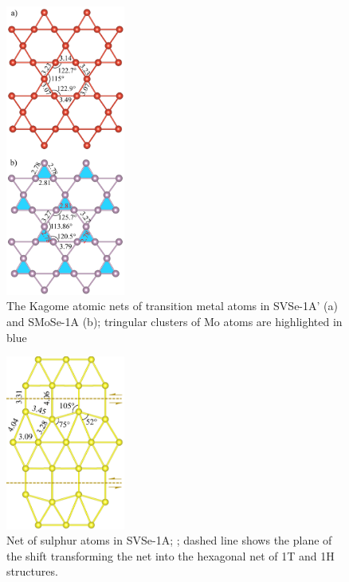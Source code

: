 \documentclass[a4paperm]{article}
\begin{document}
\begin{figure}
	\includegraphics [width=0.35\textwidth]{airss1_tm.png}
	\caption{The Kagome atomic nets of transition metal atoms in SVSe-1A' (a) and SMoSe-1A (b); tringular clusters of Mo atoms are highlighted in blue} 
\label{airss1_tm}
\end{figure}

\begin{figure}
	\includegraphics[width=0.35\textwidth]{airss1v_s.png}
	\caption{Net of sulphur atoms in SVSe-1A; ; dashed line shows the plane of the shift transforming the net into the hexagonal net of 1T and 1H structures.}
\label{airss1_s}
\end{figure}
\end{document}
